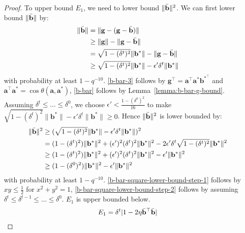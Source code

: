 \documentclass{article}
\theoremstyle{plain}
\theoremstyle{definition}
\theoremstyle{remark}
\begin{document}
\begin{proof}
To upper bound $E_1$, we need to lower bound $\lVert \Bar{\mathbf{b}}\rVert^2$. We can first lower bound $\lVert \Bar{\mathbf{b}}\rVert$ by:
\begin{align}
    \lVert \Bar{\mathbf{b}}\rVert & = \lVert \mathbf{g} - (\mathbf{g}-\Bar{\mathbf{b}})\rVert \\
    &\geq  \lVert \mathbf{g} \rVert - \lVert \mathbf{g}-\Bar{\mathbf{b}} \rVert \\
    &=\sqrt{1-(\delta^{t})^2} \lVert {\mathbf{b}^*}\rVert- \lVert \mathbf{g}-\Bar{\mathbf{b}} \rVert \label{b-bar-3}\\
    &\geq \sqrt{1-(\delta^{t})^2} \lVert {\mathbf{b}^*}\rVert - \epsilon'\delta^t \lVert \mathbf{b}^*\rVert  \label{b-bar}
\end{align}
with probability at least $1-q^{-10}$. \eqref{b-bar-3} follows by $\mathbf{g}^\top = \mathbf{a}^\top \mathbf{a}^* \mathbf{b}^{*^\top}$ and $\mathbf{a}^\top \mathbf{a}^* = \cos{\theta}(\mathbf{a}, \mathbf{a}^*)$, \eqref{b-bar} follows by Lemma~\ref{lemma:b-bar-g-bound}.
Assuming $\delta^t\leq \dots \leq \delta^0$, we choose $\epsilon'<\frac{{1-(\delta^0)^2}}{16}$ to make $\sqrt{1-(\delta^{t})^2} \lVert {\mathbf{b}^*}\rVert - \epsilon'\delta^t \lVert \mathbf{b}^*\rVert\geq0$.
Hence $\lVert \Bar{\mathbf{b}}\rVert^2$ is lower bounded by:
\begin{align}
    \lVert \Bar{\mathbf{b}}\rVert^2 & \geq (\sqrt{1-(\delta^{t})^2} \lVert {\mathbf{b}^*}\rVert - \epsilon'\delta^t \lVert \mathbf{b}^*\rVert )^2 \\
    & = (1-(\delta^{t})^2)\lVert {\mathbf{b}^*}\rVert^2 + (\epsilon')^2(\delta^{t})^2\lVert{\mathbf{b}^*}\rVert^2 -2\epsilon' \delta^{t}\sqrt{1-(\delta^{t})^2}\lVert {\mathbf{b}^*}\rVert^2 \\
    &\geq (1-(\delta^{t})^2)\lVert {\mathbf{b}^*}\rVert^2 + (\epsilon')^2(\delta^{t})^2\lVert{\mathbf{b}^*}\rVert^2 - \epsilon' \lVert{\mathbf{b}^*}\rVert^2 \label{b-bar-square-lower-bound-step-1}\\
    &\geq (1-(\delta^{0})^2)\lVert {\mathbf{b}^*}\rVert^2 - \epsilon' \lVert{\mathbf{b}^*}\rVert^2 \label{b-bar-square-lower-bound-step-2}
\end{align}
with probability at least $1-q^{-10}$. \eqref{b-bar-square-lower-bound-step-1} follows by $xy\leq \frac{1}{2}$ for $x^2+y^2=1$, \eqref{b-bar-square-lower-bound-step-2} follows by assuming $\delta^t \leq \delta^{t-1}\leq \dots \leq \delta^{0}$. $E_1$ is upper bounded below.
\begin{align}
    E_1 &= \delta^t|1-2\eta \Bar{\mathbf{b}}^\top \Bar{\mathbf{b}}| \\

\end{align}
\end{proof}
\end{document}
